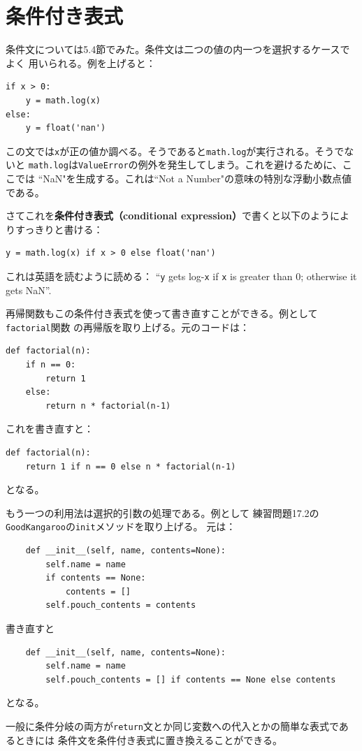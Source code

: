 \documentclass[a4j,12pt,makeidx]{jbook}
\begin{document}
\section{条件付き表式}
条件文については5.4節でみた。条件文は二つの値の内一つを選択するケースでよく
用いられる。例を上げると：
\begin{verbatim}
if x > 0:
    y = math.log(x)
else:
    y = float('nan')
\end{verbatim}
この文では{\tt x}が正の値か調べる。そうであると{\tt math.log}が実行される。そうでないと
{\tt math.log}は{\tt ValueError}の例外を発生してしまう。これを避けるために、ここでは
``NaN"を生成する。これは``Not a Number"の意味の特別な浮動小数点値である。\par
さてこれを{\bf 条件付き表式（conditional expression）}で書くと以下のようによりすっきりと書ける：
\begin{verbatim}
y = math.log(x) if x > 0 else float('nan')
\end{verbatim}
これは英語を読むように読める：
 ``{\tt y} gets log-{\tt x}
if {\tt x} is greater than 0; otherwise it gets NaN''.　\par
再帰関数もこの条件付き表式を使って書き直すことができる。例として{\tt factorial}関数
の再帰版を取り上げる。元のコードは：
\begin{verbatim}
def factorial(n):
    if n == 0:
        return 1
    else:
        return n * factorial(n-1)
\end{verbatim}
これを書き直すと：
\begin{verbatim}
def factorial(n):
    return 1 if n == 0 else n * factorial(n-1)
\end{verbatim}
となる。\par
もう一つの利用法は選択的引数の処理である。例として
練習問題17.2の{\tt GoodKangaroo}の{\tt init}メソッドを取り上げる。
元は：
\begin{verbatim}
    def __init__(self, name, contents=None):
        self.name = name
        if contents == None:
            contents = []
        self.pouch_contents = contents
\end{verbatim}
書き直すと
\begin{verbatim}
    def __init__(self, name, contents=None):
        self.name = name
        self.pouch_contents = [] if contents == None else contents 
\end{verbatim}
となる。\par
一般に条件分岐の両方が{\tt return}文とか同じ変数への代入とかの簡単な表式であるときには
条件文を条件付き表式に置き換えることができる。
%
\end{document}
